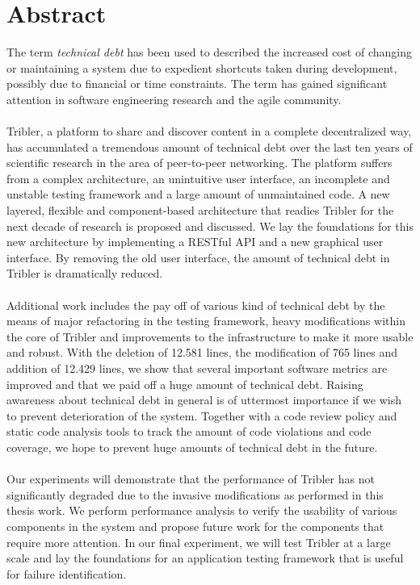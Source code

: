\chapter*{Abstract}
The term \emph{technical debt} has been used to described the increased cost of changing or maintaining a system due to expedient shortcuts taken during development, possibly due to financial or time constraints. The term has gained significant attention in software engineering research and the agile community.\\\\
Tribler, a platform to share and discover content in a complete decentralized way, has accumulated a tremendous amount of technical debt over the last ten years of scientific research in the area of peer-to-peer networking.
The platform suffers from a complex architecture, an unintuitive user interface, an incomplete and unstable testing framework and a large amount of unmaintained code.
A new layered, flexible and component-based architecture that readies Tribler for the next decade of research is proposed and discussed.
We lay the foundations for this new architecture by implementing a RESTful API and a new graphical user interface. By removing the old user interface, the amount of technical debt in Tribler is dramatically reduced.\\\\
Additional work includes the pay off of various kind of technical debt by the means of major refactoring in the testing framework, heavy modifications within the core of Tribler and improvements to the infrastructure to make it more usable and robust.
With the deletion of 12.581 lines, the modification of 765 lines and addition of 12.429 lines, we show that several important software metrics are improved and that we paid off a huge amount of technical debt. 
Raising awareness about technical debt in general is of uttermost importance if we wish to prevent deterioration of the system.
Together with a code review policy and static code analysis tools to track the amount of code violations and code coverage, we hope to prevent huge amounts of technical debt in the future.\\\\
Our experiments will demonstrate that the performance of Tribler has not significantly degraded due to the invasive modifications as performed in this thesis work. We perform performance analysis to verify the usability of various components in the system and propose future work for the components that require more attention. In our final experiment, we will test Tribler at a large scale and lay the foundations for an application testing framework that is useful for failure identification.